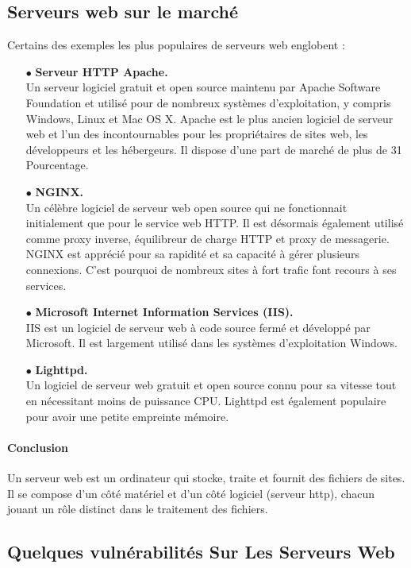 \subsection{Serveurs web sur le marché}
Certains des exemples les plus populaires de serveurs web englobent :
\begin{enumerate}
	 \item [$\bullet$]\textbf{Serveur HTTP Apache.\\} Un serveur logiciel gratuit et open source maintenu par Apache Software Foundation et  utilisé pour de nombreux systèmes d’exploitation, y compris Windows, Linux et Mac OS X. Apache est le plus ancien logiciel de serveur web et l’un des incontournables pour les propriétaires de sites web, les développeurs et les hébergeurs. Il dispose d’une part de marché de plus de 31 Pourcentage.
	 \item [$\bullet$]\textbf{NGINX.\\} Un célèbre logiciel de serveur web open source qui ne fonctionnait initialement que pour le service web HTTP. Il est désormais également utilisé comme proxy inverse, équilibreur de charge HTTP et proxy de messagerie. NGINX est apprécié pour sa rapidité et sa capacité à gérer plusieurs connexions. C’est pourquoi de nombreux sites à fort trafic font recours à ses services.
	 \item [$\bullet$]\textbf{Microsoft Internet Information Services (IIS).\\} IIS est un logiciel de serveur web à code source fermé et développé par Microsoft. Il est largement utilisé dans les systèmes d’exploitation Windows.\\
	 \item [$\bullet$]\textbf{Lighttpd.\\} Un logiciel de serveur web gratuit et open source connu pour sa vitesse tout en nécessitant moins de puissance CPU. Lighttpd est également populaire pour avoir une petite empreinte mémoire.
\end{enumerate}
\paragraph{Conclusion}
Un serveur web est un ordinateur qui stocke, traite et fournit des fichiers de sites. Il se compose d’un côté matériel et d’un côté logiciel (serveur http), chacun jouant un rôle distinct dans le traitement des fichiers.
\subsection{Quelques vulnérabilités Sur Les Serveurs Web }
